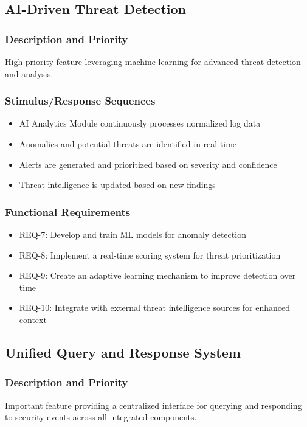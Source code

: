 \subsection{AI-Driven Threat Detection}
\subsubsection{Description and Priority}
High-priority feature leveraging machine learning for advanced threat detection and analysis.

\subsubsection{Stimulus/Response Sequences}
\begin{itemize}
    \item AI Analytics Module continuously processes normalized log data
    \item Anomalies and potential threats are identified in real-time
    \item Alerts are generated and prioritized based on severity and confidence
    \item Threat intelligence is updated based on new findings
\end{itemize}

\subsubsection{Functional Requirements}
\begin{itemize}
    \item REQ-7: Develop and train ML models for anomaly detection
    \item REQ-8: Implement a real-time scoring system for threat prioritization
    \item REQ-9: Create an adaptive learning mechanism to improve detection over time
    \item REQ-10: Integrate with external threat intelligence sources for enhanced context
\end{itemize}

\subsection{Unified Query and Response System}
\subsubsection{Description and Priority}
Important feature providing a centralized interface for querying and responding to security events across all integrated components.

